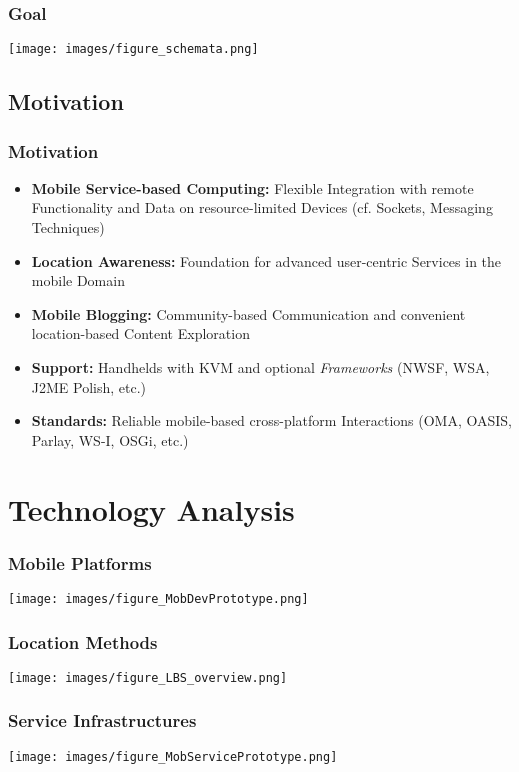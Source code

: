 \documentclass[blue]{beamer}
\begin{document}
\frame
{
\frametitle{\textbf{Goal}}
\texttt{[image: images/figure\_schemata.png]}
}



\subsection{Motivation}
\frame
{
\frametitle{\textbf{Motivation}}
\begin{itemize}[<+-|alert@+>]
  \item \textbf{Mobile Service-based Computing:} Flexible Integration
  with remote Functionality and Data on resource-limited Devices
  (cf. Sockets, Messaging Techniques)
  \item \textbf{Location Awareness:} Foundation for advanced user-centric Services in the mobile Domain 
  \item \textbf{Mobile Blogging:} Community-based Communication and convenient location-based Content Exploration
  \item \textbf{Support:} Handhelds with KVM and optional \textit{Frameworks} (NWSF, WSA, J2ME Polish, etc.)
  \item \textbf{Standards:} Reliable mobile-based cross-platform Interactions (OMA, OASIS, Parlay, WS-I, OSGi, etc.) 
\end{itemize}
}


\section{Technology Analysis}
\frame
{
\frametitle{\textbf{Mobile Platforms}}
\texttt{[image: images/figure\_MobDevPrototype.png]}
}

\frame
{
\frametitle{\textbf{Location Methods}}
\texttt{[image: images/figure\_LBS\_overview.png]}
}

\frame
{
\frametitle{\textbf{Service Infrastructures}}
\texttt{[image: images/figure\_MobServicePrototype.png]}
}
\end{document}
